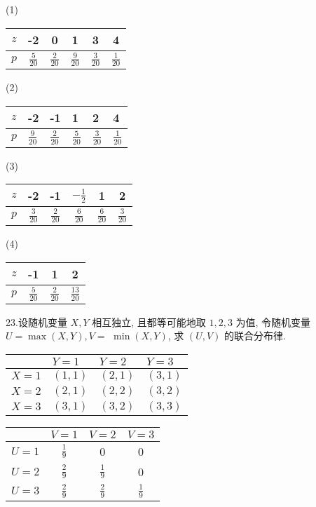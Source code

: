\documentclass[14pt]{scrartcl} %
\numberwithin{equation}{section} %
\numberwithin{figure}{section} %
\numberwithin{table}{section} %
\begin{document}
	(1)
	
	\begin{tabular}{c|c|c|c|c|c}
		$z$ & -2 & 0 & 1 & 3 & 4 \\
		\hline
		$p$ & $\frac{5}{20}$ & $\frac{2}{20}$ & $\frac{9}{20}$ & $\frac{3}{20}$ & $\frac{1}{20}$ \\
		\hline
	\end{tabular}
	
	(2) \begin{tabular}{l|l|l|l|l|l}
		$z$ & -2 & -1 & 1 & 2 & 4 \\
		\hline
		$p$ & $\frac{9}{20}$ & $\frac{2}{20}$ & $\frac{5}{20}$ & $\frac{3}{20}$ & $\frac{1}{20}$ \\
		\hline
	\end{tabular}
	
	(3) \begin{tabular}{c|c|c|c|c|c}
		$z$ & -2 & -1 & $-\frac{1}{2}$ & 1 & 2 \\
		\hline
		$p$ & $\frac{3}{20}$ & $\frac{2}{20}$ & $\frac{6}{20}$ & $\frac{6}{20}$ & $\frac{3}{20}$ \\
		\hline
	\end{tabular}
	
	(4) \begin{tabular}{c|c|c|c}
		$z$ & -1 & 1 & 2 \\
		\hline
		$p$ & $\frac{5}{20}$ & $\frac{2}{20}$ & $\frac{13}{20}$ \\
		\hline
	\end{tabular}
	
	
	23.设随机变量 $X, Y$ 相互独立, 且都等可能地取 $1,2,3$ 为值, 令随机变量 $U=\max (X, Y), V=$ $\min (X, Y)$, 求 $(U, V)$ 的联合分布律. 
	
	\begin{center}
		\begin{tabular}{l|l|l|l}
			& $Y=1$ & $Y=2$ & $Y=3$ \\
			\hline
			$X=1$ & $(1,1)$ & $(2,1)$ & $(3,1)$ \\
			\hline
			$X=2$ & $(2,1)$ & $(2,2)$ & $(3,2)$ \\
			\hline
			$X=3$ & $(3,1)$ & $(3,2)$ & $(3,3)$ \\
			\hline
		\end{tabular}
	\end{center}
	
	\begin{center}
		\begin{tabular}{c|c|c|c}
			& $V=1$ & $V=2$ & $V=3$ \\
			\hline
			$U=1$ & $\frac{1}{9}$ & 0 & 0 \\
			\hline
			$U=2$ & $\frac{2}{9}$ & $\frac{1}{9}$ & 0 \\
			\hline
			$U=3$ & $\frac{2}{9}$ & $\frac{2}{9}$ & $\frac{1}{9}$ \\
			\hline
		\end{tabular}
	\end{center}
	
\end{document}
